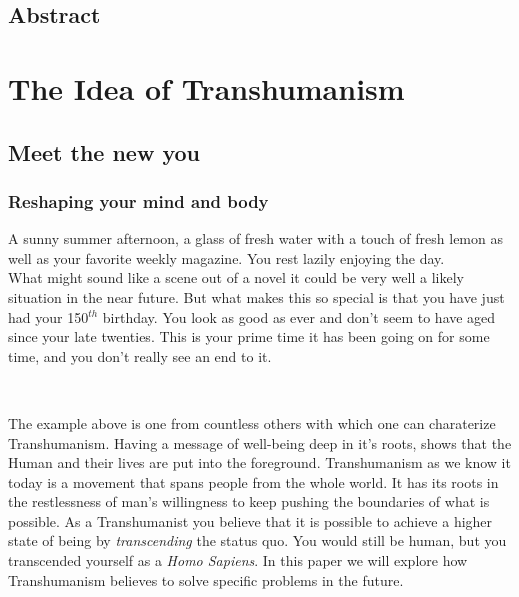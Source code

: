 \documentclass[
      12pt,
      a4paper,
      cleardoublepage=empty,
      final,
      twoside
        ]{scrbook}
\begin{document}
\section{Abstract}

\begin{par}
  
  
  
\end{par}

\newpage


\tableofcontents

\cleardoubleemptypage

\listoffigures


\cleardoubleemptypage

\mainmatter
\chapter{The Idea of Transhumanism}
  \section{Meet the new you}
    \subsection{Reshaping your mind and body}
      \begin{par}
        A sunny summer afternoon, a glass of fresh water with a touch of fresh lemon as well as your favorite weekly magazine. You rest lazily enjoying the day.\\
        What might sound like a scene out of a novel it could be very well a likely situation in the near future. 
        But what makes this so special is that you have just had your 150$^{th}$ birthday. 
        You look as good as ever and don't seem to have aged since your late twenties. 
        This is your prime time it has been going on for some time, and you don't really see an end to it.
      \end{par}
      \\
      \begin{par}
        The example above is one from countless others with which one can charaterize Transhumanism.
        Having a message of well-being deep in it's roots, shows that the Human and their lives are put into the foreground.
        Transhumanism as we know it today is a movement that spans people from the whole world.
        It has its roots in the restlessness of man's willingness to keep pushing the boundaries of what is possible.\cite{bostromhistory}
        As a Transhumanist you believe that it is possible to achieve a higher state of being by \emph{transcending} the status quo. 
        You would still be human, but you transcended yourself as a \emph{Homo Sapiens}.
        In this paper we will explore how Transhumanism believes to solve specific problems in the future.
      \end{par}
\end{document}
